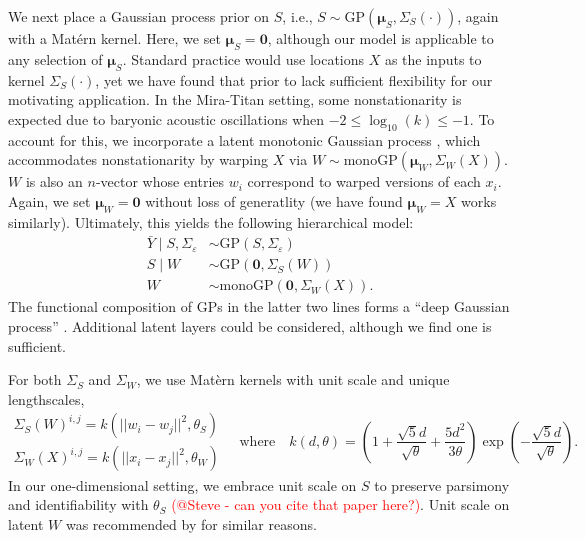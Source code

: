 \documentclass[11pt]{article}
\begin{document}
We next place a Gaussian process prior on $S$, i.e.,
$S\sim \mathrm{GP}\left(\boldsymbol{\mu}_S, \Sigma_S(\cdot)\right)$, again with a 
Mat\'ern kernel. Here, we set $\boldsymbol{\mu}_S=\mathbf{0}$, although our model
is applicable to any selection of $\boldsymbol{\mu}_S$. Standard practice would 
use locations $X$ as the inputs to kernel $\Sigma_S(\cdot)$, yet we have found that 
prior to lack sufficient flexibility for our motivating
application.  In the Mira-Titan setting, some nonstationarity is expected due to 
baryonic acoustic oscillations when $-2 \leq \log_{10}(k) \leq -1$. To account 
for this, we incorporate a latent monotonic Gaussian process \citep[monoGP;][]{barnett2025monotonic},
which accommodates nonstationarity by warping $X$ via 
$W \sim \mathrm{monoGP}\left(\boldsymbol{\mu}_W, \Sigma_W(X)\right)$.
$W$ is also an $n$-vector whose entries $w_i$ correspond to warped versions of each $x_i$.
Again, we set $\boldsymbol{\mu}_W = \mathbf{0}$ without loss of generatlity (we have
found $\boldsymbol{\mu}_W = X$ works similarly).
Ultimately, this yields the following hierarchical model:
\begin{equation}\label{eq:dgphm}
\begin{aligned}
\bar{Y}\mid S,\Sigma_\varepsilon &\sim \mathrm{GP}(S,\Sigma_\varepsilon) \\
S\mid W &\sim \mathrm{GP}\left(\mathbf{0}, \Sigma_S(W)\right) \\
W &\sim \mathrm{monoGP}\left(\mathbf{0}, \Sigma_W(X)\right).
\end{aligned}
\end{equation}
The functional composition of GPs in the latter two lines forms a ``deep Gaussian process'' 
\citep{damianou2013deep,dunlop2018deep}. Additional latent layers could be considered, 
although we find one is sufficient.

For both $\Sigma_S$ and $\Sigma_W$, we use Mat\`ern kernels with unit scale and
unique lengthscales,
\[
\begin{array}{l}
\Sigma_S(W)^{i,j} = k\left(||w_i - w_j||^2, \theta_S\right) \\[7pt]
\Sigma_W(X)^{i,j} = k\left(||x_i - x_j||^2, \theta_W\right)
\end{array}
\quad\textrm{where}\quad
k(d, \theta) = \left( 1 + \frac{\sqrt{5}d}{\sqrt{\theta}} + 
  \frac{5d^2}{3\theta}\right) \exp\left(-\frac{\sqrt{5}d}{\sqrt{\theta}}\right).
\]
In our one-dimensional setting, we embrace unit scale on $S$ to preserve parsimony 
and identifiability with $\theta_S$ \textcolor{red}{(@Steve - can you cite that paper here?)}.
Unit scale on latent $W$ was recommended by \citet{sauer2023active} for similar reasons.
\end{document}
